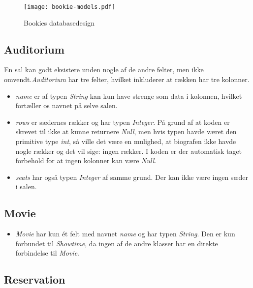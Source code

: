 \begin{figure}[h]
  \centering
  \texttt{[image: bookie-models.pdf]}
  \caption{Bookies databasedesign}
  \label{class-diagram: bookie-models}
\end{figure}

\subsection{Auditorium}

En sal kan godt eksistere unden nogle af de andre felter, men ikke omvendt.\textit{Auditorium} har tre felter, hvilket inkluderer at rækken har tre kolonner.
\begin{itemize}

  \item \textit{name} er af typen \textit{String} kan kun have strenge som data i kolonnen, hvilket fortæller os navnet på selve salen.
  \item \textit{rows} er sædernes rækker og har typen \textit{Integer}. På grund af at koden er skrevet til ikke at kunne returnere \textit{Null}, men hvis typen havde været den primitive type \textit{int}, så ville det være en mulighed, at biografen ikke havde nogle rækker og det vil sige: ingen rækker. I koden er der automatisk taget forbehold for at ingen kolonner kan være \textit{Null}.
  \item \textit{seats} har også typen \textit{Integer} af samme grund. Der kan ikke være ingen sæder i salen.

\end{itemize}

\subsection{Movie}

\begin{itemize}

  \item \textit{Movie} har kun ét felt med navnet \textit{name} og har typen \textit{String}. Den er kun forbundet til \textit{Showtime}, da ingen af de andre klasser har en direkte forbindelse til \textit{Movie}.

\end{itemize}

\subsection{Reservation}

